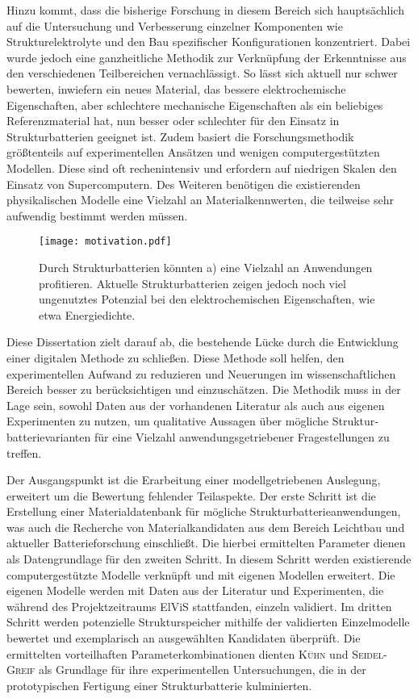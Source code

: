 Hinzu kommt, dass die bisherige Forschung in diesem Bereich sich hauptsächlich auf die Untersuchung und Verbesserung einzelner Komponenten wie Strukturelektrolyte und den Bau spezifischer Konfigurationen konzentriert. Dabei wurde jedoch eine ganzheitliche Methodik zur Verknüpfung der Erkenntnisse aus den verschiedenen Teilbereichen vernachlässigt. So lässt sich aktuell nur schwer bewerten, inwiefern ein neues Material, das bessere elektrochemische Eigenschaften, aber schlechtere mechanische Eigenschaften als ein beliebiges Referenzmaterial hat, nun besser oder schlechter für den Einsatz in Strukturbatterien geeignet ist. Zudem basiert die Forschungsmethodik größtenteils auf experimentellen Ansätzen und wenigen computergestützten Modellen. Diese sind oft rechenintensiv und erfordern auf niedrigen Skalen den Einsatz von Supercomputern. Des Weiteren benötigen die existierenden physikalischen Modelle eine Vielzahl an Materialkennwerten, die teilweise sehr aufwendig bestimmt werden müssen.

\begin{figure}[h]
        \center
	\texttt{[image: motivation.pdf]}
		\caption{\label{fig:motivation} Durch Strukturbatterien könnten a) eine Vielzahl an Anwendungen profitieren. Aktuelle Strukturbatterien zeigen jedoch noch viel ungenutztes Potenzial bei den elektrochemischen Eigenschaften, wie etwa Energiedichte.}
\end{figure}

Diese Dissertation zielt darauf ab, die bestehende Lücke durch die Entwicklung einer digitalen Methode zu schließen. Diese Methode soll helfen, den experimentellen Aufwand zu reduzieren und Neuerungen im wissenschaftlichen Bereich besser zu berücksichtigen und einzuschätzen. Die Methodik muss in der Lage sein, sowohl Daten aus der vorhandenen Literatur als auch aus eigenen Experimenten zu nutzen, um qualitative Aussagen über mögliche Struktur­batterie­varianten für eine Vielzahl anwendungs­getriebener Fragestellungen zu treffen.

Der Ausgangspunkt ist die Erarbeitung einer modellgetriebenen Auslegung, erweitert um die Bewertung fehlender Teilaspekte. Der erste Schritt ist die Erstellung einer Materialdatenbank für mögliche Struktur­batterie­anwendungen, was auch die Recherche von Materialkandidaten aus dem Bereich Leichtbau und aktueller Batterieforschung einschließt. Die hierbei ermittelten Parameter dienen als Datengrundlage für den zweiten Schritt. In diesem Schritt werden existierende computer­gestützte Modelle verknüpft und mit eigenen Modellen erweitert. Die eigenen Modelle werden mit Daten aus der Literatur und Experimenten, die während des Projektzeitraums ElViS stattfanden, einzeln validiert. Im dritten Schritt werden potenzielle Struktur­speicher mithilfe der validierten Einzelmodelle bewertet und exemplarisch an ausgewählten Kandidaten überprüft. Die ermittelten vorteilhaften Parameterkombinationen dienten \textsc{Kühn} und \textsc{Seidel-Greif} als Grundlage für ihre experimentellen Untersuchungen, die in der prototypischen Fertigung einer Struktur­batterie kulminierten.

